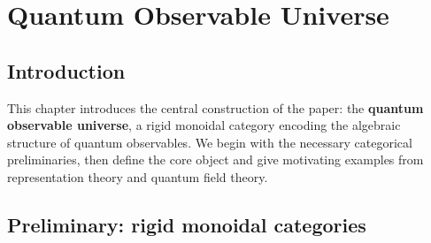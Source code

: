 \chapter{Quantum Observable Universe}
\label{chap:qou}

\section{Introduction}
\label{sec:qou-intro}

This chapter introduces the central construction of the paper: the
\textbf{quantum observable universe}, a rigid monoidal category encoding
the algebraic structure of quantum observables.  We begin with the
necessary categorical preliminaries, then define the core object
and give motivating examples from representation theory and
quantum field theory.

\section{Preliminary: rigid monoidal categories}
\label{sec:rigid-monoidal}

